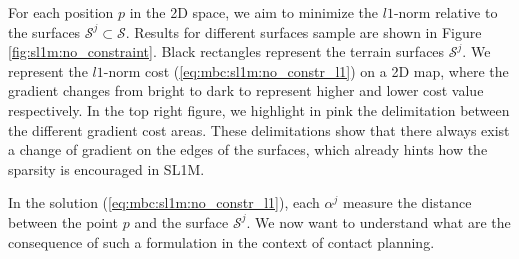 For each position $p$ in the 2D space, we aim to minimize the $l1$-norm relative to the surfaces $\mathcal{S}^j \subset \mathcal{S}$. 
Results for different surfaces sample are shown in Figure \ref{fig:sl1m:no_constraint}.
Black rectangles represent the terrain surfaces $\mathcal{S}^j$.
We represent the $l1$-norm cost (\ref{eq:mbc:sl1m:no_constr_l1}) on a 2D map, where the gradient changes from bright to dark to represent higher and lower cost value respectively.
In the top right figure, we highlight in pink the delimitation between the different gradient cost areas.
These delimitations show that there always exist a change of gradient on the edges of the surfaces, which already hints how the sparsity is encouraged in SL1M.

In the solution (\ref{eq:mbc:sl1m:no_constr_l1}), each $\alpha^j$ measure the distance between the point $p$ and the surface $\mathcal{S}^j$.
We now want to understand what are the consequence of such a formulation in the context of contact planning.



